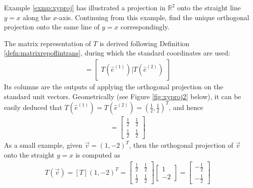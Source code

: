 \begin{exmp}
\label{exmp:xyproj2}
Example \ref{exmp:xyproj} has illustrated a projection in $\mathbb{R}^2$ onto the straight line $y = x$ along the $x$-axis. Continuing from this example, find the unique orthogonal projection onto the same line of $y = x$ correspondingly.
\end{exmp}
\begin{solution}
The matrix representation of $T$ is derived following Definition \ref{defn:matrixrepoflintrans}, during which the standard coordinates are used:
\begin{align*}
[T] =
\begin{bmatrix}
T(\hat{e}^{(1)})|T(\hat{e}^{(2)})
\end{bmatrix}
\end{align*}
Its columns are the outputs of applying the orthogonal projection on the standard unit vectors. Geometrically (see Figure \ref{fig:xyproj2} below), it can be easily deduced that $T(\hat{e}^{(1)}) = T(\hat{e}^{(2)}) = (\frac{1}{2}, \frac{1}{2})^T$, and hence
\begin{align*}
[T] =
\begin{bmatrix}
\frac{1}{2} & \frac{1}{2} \\
\frac{1}{2} & \frac{1}{2} 
\end{bmatrix}
\end{align*}
As a small example, given $\vec{v}=(1,-2)^T$, then the orthogonal projection of $\vec{v}$ onto the straight $y=x$ is computed as
\begin{align*}
T(\vec{v}) = [T](1,-2)^T = 
\begin{bmatrix}
\frac{1}{2} & \frac{1}{2} \\
\frac{1}{2} & \frac{1}{2}     
\end{bmatrix}
\begin{bmatrix}
1 \\
-2
\end{bmatrix}
=
\begin{bmatrix}
-\frac{1}{2} \\
-\frac{1}{2}
\end{bmatrix}
\end{align*}
\end{solution}
